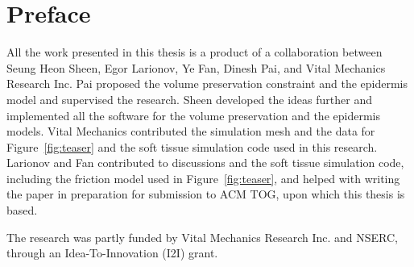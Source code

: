 
\chapter{Preface}

All the work presented in this thesis is a product of a collaboration between Seung Heon Sheen, Egor Larionov, Ye Fan, Dinesh Pai, and Vital Mechanics Research Inc.
Pai proposed the volume preservation constraint and the epidermis model and supervised the research.
Sheen developed the ideas further and implemented all the software for the volume preservation and the epidermis models. 
Vital Mechanics contributed the simulation mesh and the data for Figure~\ref{fig:teaser} and the soft tissue simulation code used in this research.
Larionov and Fan contributed to discussions and the soft tissue simulation code, including the friction model used in Figure~\ref{fig:teaser}, and helped with writing the paper in preparation for submission to ACM TOG, upon which this thesis is based.

\medskip

The research was partly funded by Vital Mechanics Research Inc. and NSERC, through an Idea-To-Innovation (I2I) grant.

